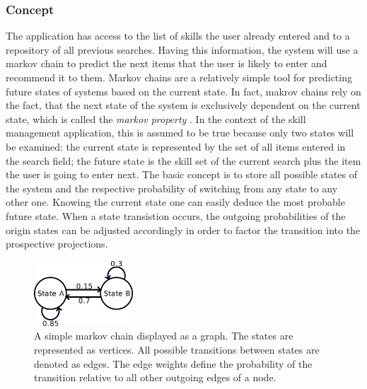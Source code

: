 \subsubsection{Concept}
The application has access to the list of skills the user already entered and to a repository of all previous searches. Having this information, the system will use a markov chain to predict the next items that the user is likely to enter and recommend it to them.
Markov chains are a relatively simple tool for predicting future states of systems based on the current state. In fact, makrov chains rely on the fact, that the next state of the system is exclusively dependent on the current state, which is called the \textit{markov property} \cite{markprop}. In the context of the skill management application, this is assumed to be true because only two states will be examined: the current state is represented by the set of all items entered in the search field; the future state is the skill set of the current search plus the item the user is going to enter next.
The basic concept is to store all possible states of the system and the respective probability of switching from any state to any other one.
Knowing the current state one can easily deduce the most probable future state. When a state transistion occurs, the outgoing probabilities of the origin states
can be adjusted accordingly in order to factor the transition into the prospective projections.
\begin{figure}[!htp]
    \centering
    \includegraphics[width=0.33\textwidth]{images/markov-chain.png}
    \caption[Diagram: Markov Chain]{A simple markov chain displayed as a graph. The states are represented as vertices. All possible transitions between states are denoted as edges. The edge weights define the probability of the transition relative to all other outgoing edges of a node.}
    \label{fig:markovchain}
\end{figure}

\newpage

